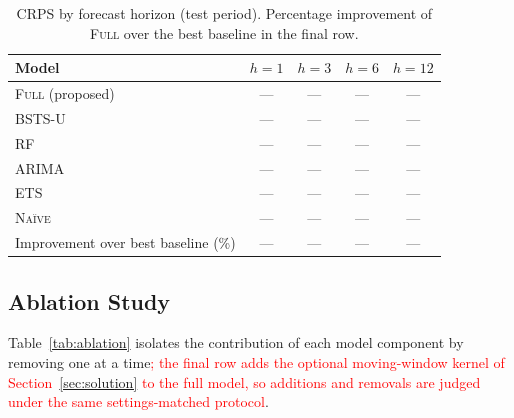 \documentclass[review]{elsarticle}
\newcommand{\rev}[1]{\textcolor{red}{#1}}
\newcommand{\rev}[1]{#1}
\begin{document}
\begin{table}
\centering
\caption{CRPS by forecast horizon (test period). Percentage improvement of \textsc{Full} over the best baseline in the final row.}
\label{tab:horizon}
\small
\begin{tabular}{lcccc}
\toprule
Model & $h=1$ & $h=3$ & $h=6$ & $h=12$ \\
\midrule
\textsc{Full} (proposed)    & --- & --- & --- & --- \\
\textsc{BSTS-U}             & --- & --- & --- & --- \\
\textsc{RF} \citep{kia2024} & --- & --- & --- & --- \\
\textsc{ARIMA}              & --- & --- & --- & --- \\
\textsc{ETS}                & --- & --- & --- & --- \\
\textsc{Na\"ive}            & --- & --- & --- & --- \\
\midrule
Improvement over best baseline (\%) & --- & --- & --- & --- \\
\bottomrule
\end{tabular}
\end{table}

\subsection{Ablation Study}

Table~\ref{tab:ablation} isolates the contribution of each model component by removing one at a time\rev{; the final row adds the optional moving-window kernel of Section~\ref{sec:solution} to the full model, so additions and removals are judged under the same settings-matched protocol}.
\end{document}
